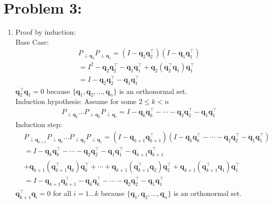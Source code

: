\documentclass[10pt]{article}
\begin{document}
\section*{Problem 3:}
\begin{enumerate}[label=(\alph*)]
    \item Proof by induction:\\
    Base Case: 
    \begin{align*}
        &P_{\perp \mathbf{q}_2}P_{\perp \mathbf{q}_1}=(I-\mathbf{q}_2\mathbf{q}_2^\top)(I-\mathbf{q}_1\mathbf{q}_1^\top)\\
        &=I^2-\mathbf{q}_2\mathbf{q}_2^\top-\mathbf{q}_1\mathbf{q}_1^\top+\mathbf{q}_2(\mathbf{q}_2^\top\mathbf{q}_1)\mathbf{q}_1^\top\\
        &=I-\mathbf{q}_2\mathbf{q}_2^\top-\mathbf{q}_1\mathbf{q}_1^\top
    \end{align*}
    $\mathbf{q}_2^\top\mathbf{q}_1=0$ because $\{\mathbf{q}_1,\mathbf{q}_2,\ldots,\mathbf{q}_n\}$ is an orthonormal set.\\
    Induction hypothesis: Assume for some $2\le k< n$ 
    \begin{align*}
        &P_{\perp \mathbf{q}_k}\ldots P_{\perp \mathbf{q}_2}P_{\perp \mathbf{q}_1}=I-\mathbf{q}_k\mathbf{q}_k^\top-\cdots-\mathbf{q}_2\mathbf{q}_2^\top-\mathbf{q}_1\mathbf{q}_1^\top
    \end{align*}
    Induction step:
    \begin{align*}
       &P_{\perp \mathbf{q}_{k+1}}P_{\perp \mathbf{q}_k}\ldots P_{\perp \mathbf{q}_2}P_{\perp \mathbf{q}_1}=(I-\mathbf{q}_{k+1}\mathbf{q}_{k+1}^\top)(I-\mathbf{q}_k\mathbf{q}_k^\top-\cdots-\mathbf{q}_2\mathbf{q}_2^\top-\mathbf{q}_1\mathbf{q}_1^\top)\\
       &=I-\mathbf{q}_k\mathbf{q}_k^\top-\cdots-\mathbf{q}_2\mathbf{q}_2^\top-\mathbf{q}_1\mathbf{q}_1^\top-\mathbf{q}_{k+1}\mathbf{q}_{k+1}^\top\\
       &+\mathbf{q}_{k+1}(\mathbf{q}_{k+1}^\top\mathbf{q}_k)\mathbf{q}_k^\top+\cdots+\mathbf{q}_{k+1}(\mathbf{q}_{k+1}^\top\mathbf{q}_2)\mathbf{q}_2^\top+\mathbf{q}_{k+1}(\mathbf{q}_{k+1}^\top\mathbf{q}_1)\mathbf{q}_1^\top\\
       &=I-\mathbf{q}_{k+1}\mathbf{q}_{k+1}^\top-\mathbf{q}_k\mathbf{q}_k^\top-\cdots-\mathbf{q}_2\mathbf{q}_2^\top-\mathbf{q}_1\mathbf{q}_1^\top
    \end{align*}
    $\mathbf{q}_{k+1}^\top\mathbf{q}_i=0$ for all $i=1\ldots k$ because $\{\mathbf{q}_1,\mathbf{q}_2,\ldots,\mathbf{q}_n\}$ is an orthonormal set.\\

\end{enumerate}
\end{document}
